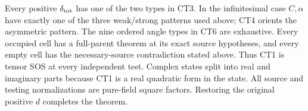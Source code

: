 Every positive \(\delta_{\rm tot}\) has one of the two
types in CT3.  In the infinitesimal case \(C,\alpha\)
have exactly one of the three weak/strong patterns
used above; CT4 orients the asymmetric pattern.
The nine ordered angle types in CT6 are exhaustive.
Every occupied cell has a full-parent theorem at its
exact source hypotheses, and every empty cell has the
necessary-source contradiction stated above.
Thus CT1 is tensor SOS at every independent test.
Complex states split into real and imaginary parts
because CT1 is a real quadratic form in the state.
All source and testing normalizations are pure-field
square factors.  Restoring the original positive \(d\)
completes the theorem.

